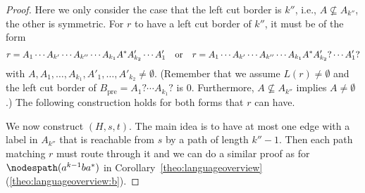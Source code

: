 \documentclass[a4paper,english]{lipics-v2016}
\theoremstyle{plain}
\begin{document}
\begin{proof}
    Here we only consider the case that the left cut border is $k''$, i.e., $A \not \subseteq A_{k''}$, the other is symmetric. 
  For $r$ to have a left cut border of $k''$, it must be of the form
 $$r = A_1 \cdots A_{k'} \cdots A_{k''} \cdots A_{k_1} A^* A'_{k_2} \cdots A'_1 
 \text{\hspace{0.25cm} or \hspace{0.25cm}}
 r = A_1 \cdots A_{k'} \cdots A_{k''} \cdots A_{k_1} A^* A'_{k_2}? \cdots A'_1?$$ 
  with $A,A_1,\ldots,A_{k_1},A'_1,\ldots,A'_{k_2}\neq \emptyset$. (Remember that we assume $L(r)\neq \emptyset$ and the left cut border of $B_\text{pre} = A_1?\cdots A_{k_1}?$ is $0$. Furthermore, $A \not \subseteq A_{k''}$ implies $A \neq \emptyset$.)  
The following construction holds for both forms that $r$ can have.

  We now construct $(H,s,t)$.  The main idea is to have at most one
  edge with a label in $A_{k''}$ that is reachable from $s$ by a path of
  length $k''-1$. Then each path matching $r$ must route through it
  and we can do a similar proof as for $\nodespath(a^{k-1}b a^*)$ in
  Corollary~\ref{theo:languageoverview}(\ref{theo:languageoverview:b}).    


\end{proof}
\end{document}

